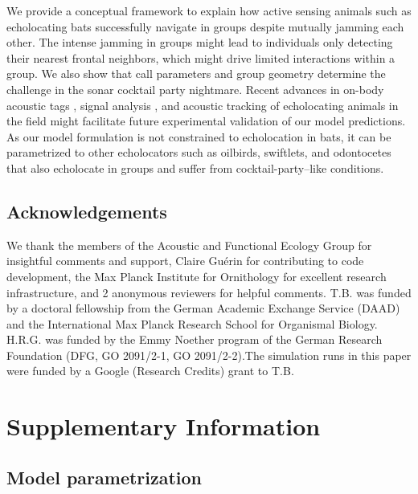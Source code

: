 \documentclass[
]{book}
\begin{document}
We provide a conceptual framework to explain how active sensing animals such as echolocating bats successfully navigate in groups despite mutually jamming each other. The intense jamming in groups might lead to individuals only detecting their nearest frontal neighbors, which might drive limited interactions within a group. We also show that call parameters and group geometry determine the challenge in the sonar cocktail party nightmare. Recent advances in on-body acoustic tags \citep{cvikel2015b, stidsholt2018a}, signal analysis \citep{aodha2018a}, and acoustic tracking \citep{seibert2015bidirectional} of echolocating animals in the field might facilitate future experimental validation of our model predictions. As our model formulation is not constrained to echolocation in bats, it can be parametrized to other echolocators such as oilbirds, swiftlets, and odontocetes \citep{brinklov2013echolocation, surlykke2014a} that also echolocate in groups and suffer from cocktail-party--like conditions.

\hypertarget{acknowledgements}{%
\subsection{Acknowledgements}\label{acknowledgements}}

We thank the members of the Acoustic and Functional Ecology Group for insightful comments and support, Claire Guérin for contributing to code development, the Max Planck Institute for Ornithology for excellent research infrastructure, and 2 anonymous reviewers for helpful comments. T.B. was funded by a doctoral fellowship from the German Academic Exchange Service (DAAD) and the International Max Planck Research School for Organismal Biology. H.R.G. was funded by the Emmy Noether program of the German Research Foundation (DFG, GO 2091/2-1, GO 2091/2-2).The simulation runs in this paper were funded by a Google (Research Credits) grant to T.B.

\newpage

\hypertarget{supplementary-information}{%
\section{Supplementary Information}\label{supplementary-information}}

\hypertarget{model-parametrization-1}{%
\subsection{Model parametrization}\label{model-parametrization-1}}
\end{document}
